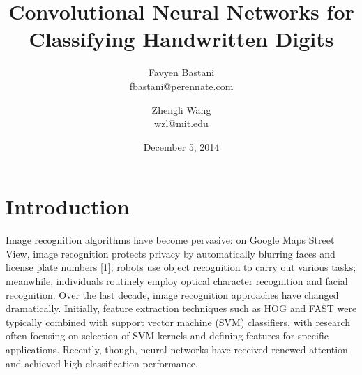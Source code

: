 \documentclass[10pt,twocolumn]{article}
\title{Convolutional Neural Networks for Classifying Handwritten Digits}
\date{December 5, 2014}
\author{
	Favyen Bastani \\
	fbastani@perennate.com
	\and
	Zhengli Wang \\
	wzl@mit.edu
}
\begin{document}
\maketitle

\section{Introduction}

Image recognition algorithms have become pervasive: on Google Maps Street View, image recognition protects privacy by automatically blurring faces and license plate numbers [1]; robots use object recognition to carry out various tasks; meanwhile, individuals routinely employ optical character recognition and facial recognition. Over the last decade, image recognition approaches have changed dramatically. Initially, feature extraction techniques such as HOG and FAST were typically combined with support vector machine (SVM) classifiers, with research often focusing on selection of SVM kernels and defining features for specific applications. Recently, though, neural networks have received renewed attention and achieved high classification performance.

\end{document}
